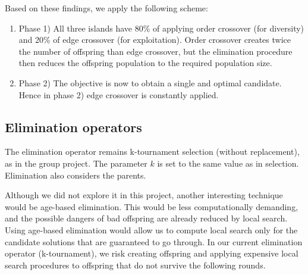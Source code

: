 \documentclass[a4paper,10pt]{article}
\newcommand{\ReplaceMe}[1]{{\color{blue}#1}}
\begin{document}
	Based on these findings, we apply the following scheme:
	\begin{enumerate}
		\item Phase 1) All three islands have 80\% of applying order crossover (for diversity) and 20\% of edge crossover (for exploitation). Order crossover creates twice the number of offspring than edge crossover, but the elimination procedure then reduces the offspring population to the required population size.
		\item Phase 2) The objective is now to obtain a single and optimal candidate. Hence in phase 2) edge crossover is constantly applied.
	\end{enumerate}



\subsection{Elimination operators}
	
	The elimination operator remains k-tournament selection (without replacement), as in the group project. The parameter $k$ is set to the same value as in selection. Elimination also considers the parents.
	
	Although we did not explore it in this project, another interesting technique would be age-based elimination. This would be less computationally demanding, and the possible dangers of bad offspring are already reduced by local search. Using age-based elimination would allow us to compute local search only for the candidate solutions that are guaranteed to go through. In our current elimination operator (k-tournament), we risk creating offspring and applying expensive local search procedures to offspring that do not survive the following rounds.
	
\end{document}
